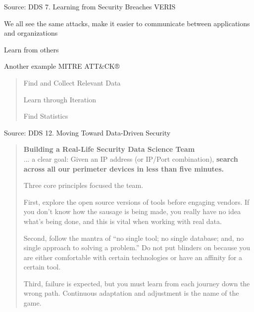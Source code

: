 \documentclass[Screen16to9,17pt]{foils}
\begin{document}
Source: DDS 7. Learning from Security Breaches VERIS
\begin{list2}
\item We all see the same attacks, make it easier to communicate between applications and organizations
\item Learn from others
\item Another example MITRE ATT\&CK® 
\end{list2}




\begin{quote}
\begin{list2}
\item Find and Collect Relevant Data
\item Learn through Iteration
\item Find Statistics
\end{list2}

\end{quote}
Source: DDS 12. Moving Toward Data-Driven Security




\begin{quote}{\bf
Building a Real-Life Security Data Science Team}\\

... a clear goal: Given an IP address (or IP/Port combination), {\bf search across all our perimeter devices in less than five minutes.}

Three core principles focused the team.
\begin{list2}
\item First, explore the open source versions of tools before engaging vendors. If you don’t
know how the sausage is being made, you really have no idea what’s being done, and
this is vital when working with real data.
\item Second, follow the mantra of “no single tool; no single database; and, no single approach
to solving a problem.” Do not put blinders on because you are either comfortable with
certain technologies or have an affinity for a certain tool.
\item Third, failure is expected, but you must learn from each journey down the wrong path.
Continuous adaptation and adjustment is the name of the game.
\end{list2}
\end{quote}
\end{document}
